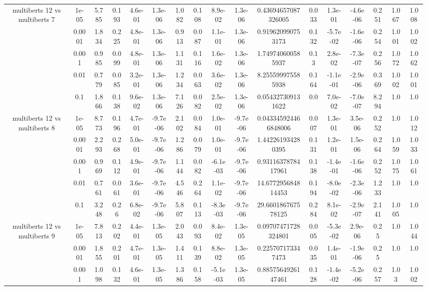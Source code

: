 \begin{tabular}{|c|c|c|c|c|c|c|c|c|c|c|c|c|c|c|c|c|}
\hline
\multirow{5}{*}{multiberts 12 vs multiberts 7} & 1e-05 & 5.785 & 0.193 & 4.6e-01 & 1.3e-06 & 1.082 & 0.108 & 8.9e-02 & 1.3e-06 & 0.43694657087326005 & 0.033 & 1.3e-01 & -4.6e-06 & 0.251 & 1.067 & 1.008 \\
 & 0.0001 & 1.834 & 0.225 & 4.8e-01 & 1.3e-06 & 0.913 & 0.087 & 1.1e-01 & 1.3e-06 & 0.919620990753173 & 0.132 & -5.7e-02 & -1.6e-06 & 0.254 & 1.001 & 1.002 \\
 & 0.001 & 0.985 & 0.099 & 4.8e-01 & 1.3e-06 & 1.131 & 0.116 & 1.6e-02 & 1.3e-06 & 1.749740600585937 & 0.13 & 2.8e-02 & -7.3e-07 & 0.256 & 1.072 & 1.062 \\
 & 0.01 & 0.779 & 0.085 & 3.2e-01 & 1.3e-06 & 1.234 & 0.063 & 3.6e-02 & 1.3e-06 & 8.255599975585938 & 0.164 & -1.1e-01 & -2.9e-06 & 0.369 & 1.002 & 1.001 \\
 & 0.1 & 1.866 & 0.138 & 9.6e-02 & 1.3e-06 & 7.126 & 0.082 & 2.5e-02 & 1.3e-06 & 0.054327309131622 & 0.0 & 7.0e-02 & -7.0e-07 & 8.294 & 1.0 & 1.0 \\
\hline
\multirow{5}{*}{multiberts 12 vs multiberts 8} & 1e-05 & 8.773 & 0.196 & 4.7e-01 & -9.7e-06 & 2.102 & 0.084 & 1.0e-01 & -9.7e-06 & 0.043345924466848006 & 0.007 & 1.3e-01 & 3.5e-06 & 0.252 & 1.0 & 1.012 \\
 & 0.0001 & 2.293 & 0.268 & 5.0e-01 & -9.7e-06 & 1.286 & 0.079 & 1.0e-01 & -9.7e-06 & 1.442261934280395 & 0.131 & 1.2e-01 & 1.5e-06 & 0.264 & 1.059 & 1.033 \\
 & 0.001 & 0.969 & 0.112 & 4.9e-01 & -9.7e-06 & 1.144 & 0.082 & -6.1e-03 & -9.7e-06 & 0.9311637878417961 & 0.138 & -1.4e-01 & -1.6e-06 & 0.252 & 1.075 & 1.061 \\
 & 0.01 & 0.761 & 0.061 & 3.6e-01 & -9.7e-06 & 4.546 & 0.264 & 1.1e-02 & -9.7e-06 & 14.677295684814453 & 0.194 & -8.0e-02 & -2.3e-06 & 1.233 & 1.0 & 1.0 \\
 & 0.1 & 3.248 & 0.26 & 6.8e-02 & -9.7e-06 & 5.807 & 0.113 & -8.3e-03 & -9.7e-06 & 29.660186767578125 & 0.284 & 8.1e-02 & -2.9e-07 & 2.141 & 1.005 & 1.0 \\
\hline
\multirow{5}{*}{multiberts 12 vs multiberts 9} & 1e-05 & 7.813 & 0.202 & 4.4e-01 & 1.3e-05 & 2.043 & 0.093 & 8.4e-02 & 1.3e-05 & 0.09707471728324801 & 0.005 & -5.3e-02 & 2.9e-06 & 0.25 & 1.0 & 1.044 \\
 & 0.0001 & 1.855 & 0.201 & 4.7e-01 & 1.3e-05 & 1.411 & 0.139 & 8.8e-02 & 1.3e-05 & 0.225707173347473 & 0.035 & 1.4e-01 & -1.9e-06 & 0.25 & 1.0 & 1.0 \\
 & 0.001 & 1.098 & 0.132 & 4.6e-01 & 1.3e-05 & 1.386 & 0.158 & -5.1e-03 & 1.3e-05 & 0.8857564926147461 & 0.128 & -1.4e-02 & -5.2e-06 & 0.257 & 1.03 & 1.002 \\

\end{tabular}

